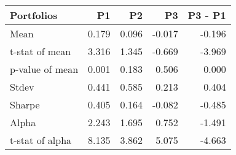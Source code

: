 \begin{tabular}{lrrrr}
\toprule
Portfolios & P1 & P2 & P3 & P3 - P1 \\
\midrule
Mean & 0.179 & 0.096 & -0.017 & -0.196 \\
t-stat of mean & 3.316 & 1.345 & -0.669 & -3.969 \\
p-value of mean & 0.001 & 0.183 & 0.506 & 0.000 \\
Stdev & 0.441 & 0.585 & 0.213 & 0.404 \\
Sharpe & 0.405 & 0.164 & -0.082 & -0.485 \\
Alpha & 2.243 & 1.695 & 0.752 & -1.491 \\
t-stat of alpha & 8.135 & 3.862 & 5.075 & -4.663 \\
\bottomrule
\end{tabular}
